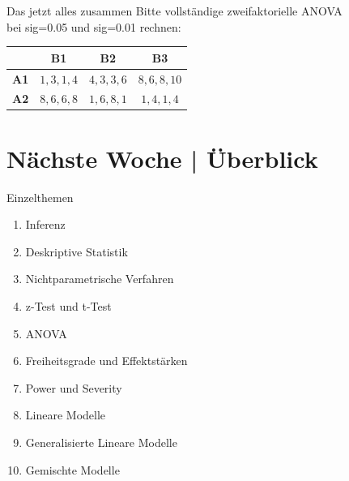 \begin{frame}
  {Das jetzt alles zusammen}
  Bitte vollständige zweifaktorielle ANOVA\\
  bei sig=0.05 und sig=0.01 rechnen:\\

  \begin{center}
    \begin{tabular}[h!]{|c||c|c|c|}
      \hline
      & \textbf{B1} & \textbf{B2} & \textbf{B3} \\
      \hline
      \hline
      \textbf{A1} & $1, 3, 1, 4$ & $4, 3, 3, 6$ & $8, 6, 8, 10$ \\
      \hline
      \textbf{A2} & $8, 6, 6, 8$ & $1, 6, 8, 1$ & $1, 4, 1, 4$ \\
      \hline
    \end{tabular}
  \end{center}
\end{frame}


\ifdefined\TITLE
  \section{Nächste Woche | Überblick}

  \begin{frame}
    {Einzelthemen}
    \begin{enumerate}
      \item Inferenz
      \item Deskriptive Statistik
      \item Nichtparametrische Verfahren
      \item z-Test und t-Test
      \item ANOVA
      \item \alert{Freiheitsgrade und Effektstärken}
      \item Power und Severity
      \item Lineare Modelle
      \item Generalisierte Lineare Modelle
      \item Gemischte Modelle
    \end{enumerate}
  \end{frame}
\fi

